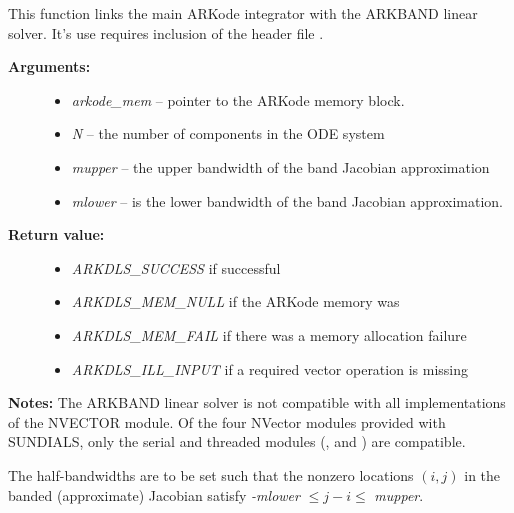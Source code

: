 \documentclass[letterpaper,10pt,english]{sphinxmanual}
\begin{document}
\begin{fulllineitems}
\label{c_interface/User_callable:c.ARKBand}
This function links the main ARKode integrator with the ARKBAND
linear solver.  It's use requires inclusion of the header file
.
\begin{description}
\item[{\textbf{Arguments:}}] \leavevmode\begin{itemize}
\item {} 
\emph{arkode\_mem} -- pointer to the ARKode memory block.

\item {} 
\emph{N} -- the number of components in the ODE system

\item {} 
\emph{mupper} -- the upper bandwidth of the band Jacobian approximation

\item {} 
\emph{mlower} -- is the lower bandwidth of the band Jacobian approximation.

\end{itemize}

\item[{\textbf{Return value:}}] \leavevmode\begin{itemize}
\item {} 
\emph{ARKDLS\_SUCCESS}   if successful

\item {} 
\emph{ARKDLS\_MEM\_NULL}  if the ARKode memory was 

\item {} 
\emph{ARKDLS\_MEM\_FAIL}  if there was a memory allocation failure

\item {} 
\emph{ARKDLS\_ILL\_INPUT} if a required vector operation is missing

\end{itemize}

\end{description}

\textbf{Notes:} The ARKBAND linear solver is not compatible with all
implementations of the NVECTOR module.  Of the four NVector
modules provided with SUNDIALS, only the serial and threaded
modules ({\hyperref[nvectors/NVector_Serial:nvectors-nvserial]{\emph{}}}, {\hyperref[nvectors/NVector_OpenMP:nvectors-openmp]{\emph{}}} and
{\hyperref[nvectors/NVector_Pthreads:nvectors-pthreads]{\emph{}}}) are compatible.

The half-bandwidths are to be set such that the nonzero locations
\((i, j)\) in the banded (approximate) Jacobian satisfy \emph{-mlower}
\(\le j-i \le\) \emph{mupper}.

\end{fulllineitems}
\end{document}
